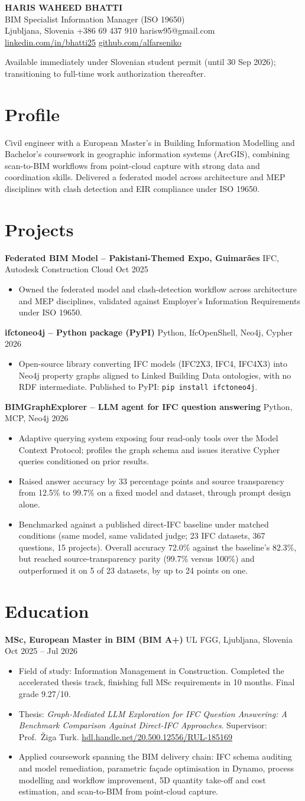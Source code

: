 \documentclass[a4paper,10.5pt]{article}
\newcommand{\datefill}{\dotfill}
\newcommand{\entry}[3]{\vspace{2.5pt}\noindent\textbf{#1} \textbar{} #2 \datefill{} #3\par\vspace{0.5pt}}
\newcommand{\ROLELINE}{BIM Specialist \textbar{} Information Manager (ISO 19650)}
\newcommand{\projIfcToNeo}{%
\entry{ifctoneo4j -- Python package (PyPI)}{Python, IfcOpenShell, Neo4j, Cypher}{2026}
\begin{itemize}
  \item Open-source library converting IFC models (IFC2X3, IFC4, IFC4X3) into Neo4j
        property graphs aligned to Linked Building Data ontologies, with no RDF
        intermediate. Published to PyPI: \texttt{pip install ifctoneo4j}.
\end{itemize}}
\newcommand{\projBIMGraph}{%
\entry{BIMGraphExplorer -- LLM agent for IFC question answering}{Python, MCP, Neo4j}{2026}
\begin{itemize}
  \item Adaptive querying system exposing four read-only tools over the Model
        Context Protocol; profiles the graph schema and issues iterative Cypher
        queries conditioned on prior results.
  \item Raised answer accuracy by 33 percentage points and source transparency from
        12.5\% to 99.7\% on a fixed model and dataset, through prompt design alone.
  \item Benchmarked against a published direct-IFC baseline under matched
        conditions (same model, same validated judge; 23 IFC datasets, 367
        questions, 15 projects). Overall accuracy 72.0\% against the baseline's
        82.3\%, but reached source-transparency parity (99.7\% versus 100\%) and
        outperformed it on 5 of 23 datasets, by up to 24 points on one.
\end{itemize}}
\newcommand{\projGuimaraes}{%
\entry{Federated BIM Model -- Pakistani-Themed Expo, Guimar\~aes}{IFC, Autodesk Construction Cloud}{Oct 2025}
\begin{itemize}
  \item Owned the federated model and clash-detection workflow across architecture
        and MEP disciplines, validated against Employer's Information Requirements
        under ISO 19650.
\end{itemize}}
\begin{document}
\begin{center}
  {\LARGE\bfseries HARIS WAHEED BHATTI}\\[2pt]
  {\large \ROLELINE}\\[3pt]
  Ljubljana, Slovenia \textbar{} +386 69 437 910 \textbar{} harisw95@gmail.com\\
  \href{https://linkedin.com/in/bhatti25}{linkedin.com/in/bhatti25} \textbar{}
  \href{https://github.com/alfarseniko}{github.com/alfarseniko}
\end{center}
\vspace{-4pt}
\noindent\small Available immediately under Slovenian student permit (until 30 Sep 2026); transitioning to full-time work authorization thereafter.\normalsize

\section{Profile}

\noindent Civil engineer with a European Master's in Building Information Modelling and
Bachelor's coursework in geographic information systems (ArcGIS), combining
scan-to-BIM workflows from point-cloud capture with strong data and coordination
skills. Delivered a federated model across architecture and MEP disciplines with
clash detection and EIR compliance under ISO 19650.

\section{Projects}

 \projGuimaraes \projIfcToNeo \projBIMGraph

\section{Education}
\entry{MSc, European Master in BIM (BIM A+)}{UL FGG, Ljubljana, Slovenia}{Oct 2025 -- Jul 2026}
\begin{itemize}
  \item Field of study: Information Management in Construction. Completed the
        accelerated thesis track, finishing full MSc requirements in 10 months.
        Final grade 9.27/10.
  \item Thesis: \textit{Graph-Mediated LLM Exploration for IFC Question Answering:
        A Benchmark Comparison Against Direct-IFC Approaches}. Supervisor:
        Prof.~\v{Z}iga Turk. \href{http://hdl.handle.net/20.500.12556/RUL-185169}{hdl.handle.net/20.500.12556/RUL-185169}
  \item Applied coursework spanning the BIM delivery chain: IFC schema auditing and model remediation, parametric façade optimisation in Dynamo, process modelling and workflow improvement, 5D quantity take-off and cost estimation, and scan-to-BIM from point-cloud capture.
\end{itemize}
\end{document}
